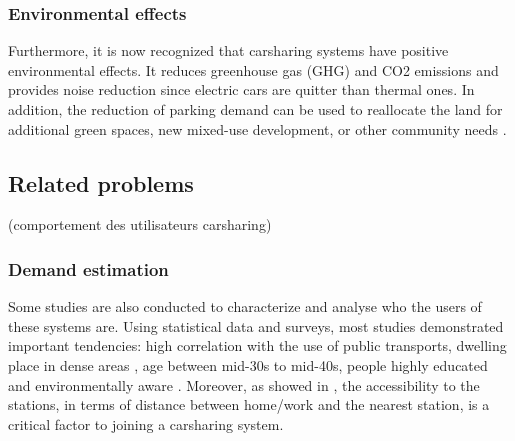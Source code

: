 \begin{bibunit}[ieeetr]



\subsubsection{Environmental effects}
Furthermore, it is now recognized that carsharing systems have positive environmental effects.
It reduces greenhouse gas (GHG) and CO2 emissions \cite{martin_greenhouse_2011, firnkorn_what_2011} and provides noise reduction since electric cars are quitter than thermal ones.
In addition, the reduction of parking demand can be used to reallocate the land for additional green spaces, new mixed-use development, or other community needs \cite{cohen_carsharing_2008}.




\subsection{Related problems}

\cite{leclerc_unraveling_2013} (comportement des utilisateurs carsharing)\\

\subsubsection{Demand estimation}
Some studies are also conducted to characterize and analyse who the users of these systems are.
Using statistical data and surveys, most studies demonstrated important tendencies: high correlation with the use of public transports, dwelling place in dense areas \cite{cervero_city_2003, millard_ball_car_sharing_2005, burkhardt_who_2006}, age between mid-30s to mid-40s, people highly educated and environmentally aware \cite{costain_synopsis_2012, efthymiou_which_2012, millard_ball_car_sharing_2005, brook_carsharingstart_2004, lane_phillycarshare_2005, zheng_carsharing_2009}.
Moreover, as showed in \cite{costain_synopsis_2012, efthymiou_which_2012, zheng_carsharing_2009}, the accessibility to the stations, in terms of distance between home/work and the nearest station, is a critical factor to joining a carsharing system.


\end{bibunit}
